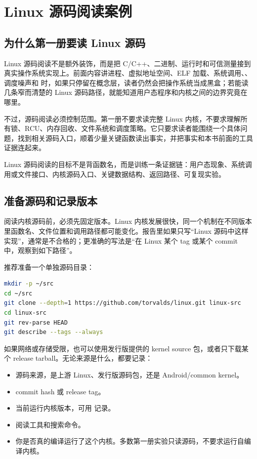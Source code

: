 \chapter{Linux 源码阅读案例}

\section{为什么第一册要读 Linux 源码}

Linux 源码阅读不是额外装饰，而是把 C/C++、二进制、运行时和可信测量接到真实操作系统实现上。前面内容讲进程、虚拟地址空间、ELF 加载、系统调用、、调度噪声和  时，如果只停留在概念层，读者仍然会把操作系统当成黑盒；若能读几条窄而清楚的 Linux 源码路径，就能知道用户态程序和内核之间的边界究竟在哪里。

不过，源码阅读必须控制范围。第一册不要求读完整 Linux 内核，不要求理解所有锁、RCU、内存回收、文件系统和调度策略。它只要求读者能围绕一个具体问题，找到相关源码入口，顺着少量关键函数读出事实，并把事实和本书前面的工具证据连起来。

\begin{keyidea}
Linux 源码阅读的目标不是背函数名，而是训练一条证据链：用户态现象、系统调用或文件接口、内核源码入口、关键数据结构、返回路径、可复现实验。
\end{keyidea}

\section{准备源码和记录版本}

阅读内核源码前，必须先固定版本。Linux 内核发展很快，同一个机制在不同版本里函数名、文件位置和调用路径都可能变化。报告里如果只写“Linux 源码中这样实现”，通常是不合格的；更准确的写法是“在 Linux 某个 tag 或某个 commit 中，观察到如下路径”。

推荐准备一个单独源码目录：

\begin{lstlisting}[language=bash]
mkdir -p ~/src
cd ~/src
git clone --depth=1 https://github.com/torvalds/linux.git linux-src
cd linux-src
git rev-parse HEAD
git describe --tags --always
\end{lstlisting}

如果网络或存储受限，也可以使用发行版提供的 kernel source 包，或者只下载某个 release tarball。无论来源是什么，都要记录：

\begin{itemize}
  \item 源码来源，是上游 Linux、发行版源码包，还是 Android/common kernel。
  \item commit hash 或 release tag。
  \item 当前运行内核版本，可用  记录。
  \item 阅读工具和搜索命令。
  \item 你是否真的编译运行了这个内核。多数第一册实验只读源码，不要求运行自编译内核。
\end{itemize}

